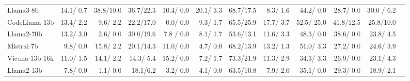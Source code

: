 \begin{table}[t!]
{\begin{tabular}{@{}lr*{10}{d{4.4}}@{}}
\colorbox{boxgreen}{Llama3-8b} &  14.1/\phantom{1} 0.7 & 38.8/10.0 & 36.7/22.3 & 10.4/\phantom{1} 0.0& 20.1/\phantom{1} 3.3 &  68.7/17.5 &  8.3/ \phantom{1}1.6& 44.2/\phantom{1} 0.0 & 28.7/\phantom{1} 0.0 & 30.0 / \phantom{1} 6.2 \\



\colorbox{boxgreen}{CodeLlama-13b} & 13.4/\phantom{1} 2.2 & 9.6/\phantom{1} 2.2 & 22.2/17.0 & 0.0/\phantom{1} 0.0 &  9.3/\phantom{1} 1.7 & 65.5/25.9 & 17.7/\phantom{1} 3.7 & 52.5/ 25.0 & 41.8/12.5 &  25.8/10.0 \\


\colorbox{boxgreen}{Llama2-70b} & 13.2/\phantom{1} 3.0 & 2.6/\phantom{1} 0.0  & 30.0/19.6 & 7.8 / \phantom{1} 0.0 & 8.1/\phantom{1} 1.7  & 53.6/13.1 & 11.6/\phantom{1} 3.3 & 48.3/\phantom{1} 0.0    & 38.6/\phantom{1} 0.0 & 23.8/ \phantom{1} 4.5 \\



\colorbox{boxgreen}{Mistral-7b} & 9.8/\phantom{1} 0.0 & 15.8/\phantom{1} 2.2 & 20.1/14.3 & 11.0/\phantom{1} 0.0 & 4.7/\phantom{1} 0.0 & 68.2/13.9 & 13.2/\phantom{1} 1.3 & 51.0/\phantom{1} 3.3 & 27.2/\phantom{1} 0.0 & 24.6/\phantom{1} 3.9 \\

\colorbox{boxgreen}{Vicuna-13b-16k} & 11.0/\phantom{1} 1.5  & 14.1/\phantom{1} 2.2 & 14.3/\phantom{1} 5.4 & 15.2/\phantom{1} 0.0  & 7.2/\phantom{1} 1.7  & 73.3/21.9 & 11.3/\phantom{1} 2.9 & 34.3/\phantom{1} 3.3 & 26.9/\phantom{1} 0.0 &  23.1/ \phantom{1} 4.3 \\


\colorbox{boxgreen}{Llama2-13b}  & 7.8/\phantom{1} 0.0  & 1.1/\phantom{1} 0.0 & 18.1/\phantom{1}6.2 & 3.2/ \phantom{1} 0.0  & 4.1/\phantom{1} 0.0           & 63.5/10.8  & 7.9/\phantom{1} 2.0 & 35.1/\phantom{1} 0.0  & 29.3/\phantom{1} 0.0  & 18.9/ \phantom{1} 2.1  \\




\bottomrule

\end{tabular}}

\vspace{-5mm}
\label{tab: results of different tasks}
\end{table}




